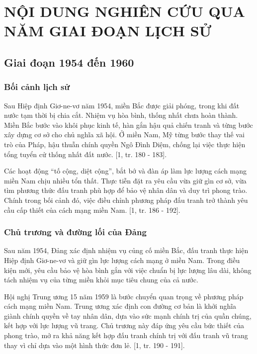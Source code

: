 \chapter{NỘI DUNG NGHIÊN CỨU QUA NĂM GIAI ĐOẠN LỊCH SỬ}

\section{Giai đoạn 1954 đến 1960}

\subsection{Bối cảnh lịch sử}

Sau Hiệp định Giơ-ne-vơ năm 1954, miền Bắc được giải phóng, trong khi đất nước tạm thời bị chia cắt. Nhiệm vụ hòa bình, thống nhất chưa hoàn thành. Miền Bắc bước vào khôi phục kinh tế, hàn gắn hậu quả chiến tranh và từng bước xây dựng cơ sở cho chủ nghĩa xã hội. Ở miền Nam, Mỹ từng bước thay thế vai trò của Pháp, hậu thuẫn chính quyền Ngô Đình Diệm, chống lại việc thực hiện tổng tuyển cử thống nhất đất nước. [1, tr. 180 - 183].

Các hoạt động “tố cộng, diệt cộng”, bắt bớ và đàn áp làm lực lượng cách mạng miền Nam chịu nhiều tổn thất. Thực tiễn đặt ra yêu cầu vừa giữ gìn cơ sở, vừa tìm phương thức đấu tranh phù hợp để bảo vệ nhân dân và duy trì phong trào. Chính trong bối cảnh đó, việc điều chỉnh phương pháp đấu tranh trở thành yêu cầu cấp thiết của cách mạng miền Nam. [1, tr. 186 - 192].

\subsection{Chủ trương và đường lối của Đảng}

Sau năm 1954, Đảng xác định nhiệm vụ củng cố miền Bắc, đấu tranh thực hiện Hiệp định Giơ-ne-vơ và giữ gìn lực lượng cách mạng ở miền Nam. Trong điều kiện mới, yêu cầu bảo vệ hòa bình gắn với việc chuẩn bị lực lượng lâu dài, không tách nhiệm vụ của từng miền khỏi mục tiêu chung của cả nước.

Hội nghị Trung ương 15 năm 1959 là bước chuyển quan trọng về phương pháp cách mạng miền Nam. Trung ương xác định con đường cơ bản là khởi nghĩa giành chính quyền về tay nhân dân, dựa vào sức mạnh chính trị của quần chúng, kết hợp với lực lượng vũ trang. Chủ trương này đáp ứng yêu cầu bức thiết của phong trào, mở ra khả năng kết hợp đấu tranh chính trị với đấu tranh vũ trang thay vì chỉ dựa vào một hình thức đơn lẻ. [1, tr. 190 - 191].

